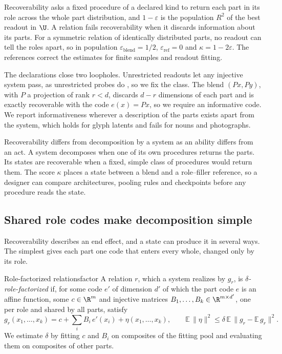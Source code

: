 Recoverability asks a fixed procedure of a declared kind to return each part in its role across the whole part distribution, and $1 - \varepsilon$ is the population $R^2$ of the best readout in $\U$. A relation fails recoverability when it discards information about its parts. For a symmetric relation of identically distributed parts, no readout can tell the roles apart, so in population $\varepsilon_{\mathrm{blend}} = 1/2$, $\varepsilon_{\mathrm{ref}} = 0$ and $\kappa = 1 - 2\varepsilon$. The references correct the estimates for finite samples and readout fitting.

The declarations close two loopholes. Unrestricted readouts let any injective system pass, as unrestricted probes do \citep{hewitt2019}, so we fix the class. The blend $(Px, Py)$, with $P$ a projection of rank $r < d$, discards $d - r$ dimensions of each part and is exactly recoverable with the code $e(x) = Px$, so we require an informative code. We report informativeness wherever a description of the parts exists apart from the system, which holds for glyph latents and fails for nouns and photographs.

Recoverability differs from decomposition by a system as an ability differs from an act. A system decomposes when one of its own procedures returns the parts. Its states are recoverable when a fixed, simple class of procedures would return them. The score $\kappa$ places a state between a blend and a role--filler reference, so a designer can compare architectures, pooling rules and checkpoints before any procedure reads the state.

\subsection{Shared role codes make decomposition simple}
\label{sec:mechanics}

Recoverability describes an end effect, and a state can produce it in several ways. The simplest gives each part one code that enters every whole, changed only by its role.

\begin{defbox}{Role-factorized relations}{factor}
A relation $r$, which a system realizes by $g_r$, is \emph{$\delta$-role-factorized} if, for some code $e'$ of dimension $d'$ of which the part code $e$ is an affine function, some $c \in \R^m$ and injective matrices $B_1, \ldots, B_k \in \R^{m \times d'}$, one per role and shared by all parts, satisfy
\begin{equation}
  g_r(x_1, \ldots, x_k) = c + \textstyle\sum_{i} B_i\, e'(x_i) + \eta(x_1, \ldots, x_k), \qquad \mathbb{E}\,\lVert \eta \rVert^2 \le \delta\, \mathbb{E}\,\lVert g_r - \mathbb{E}\,g_r \rVert^2 .
  \label{eq:factor}
\end{equation}
We estimate $\delta$ by fitting $c$ and $B_i$ on composites of the fitting pool and evaluating them on composites of other parts.
\end{defbox}

